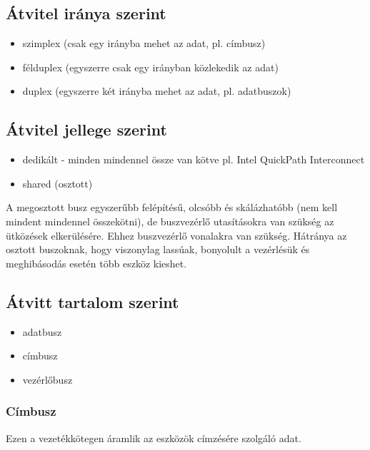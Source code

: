 \subsection{Átvitel iránya szerint}
\begin{itemize}
    \item szimplex (csak egy irányba mehet az adat, pl. címbusz)
    \item félduplex (egyszerre csak egy irányban közlekedik az adat)
    \item duplex (egyszerre két irányba mehet az adat, pl. adatbuszok)
\end{itemize}

\subsection{Átvitel jellege szerint}
\begin{itemize}
    \item dedikált - minden mindennel össze van kötve pl. Intel QuickPath Interconnect
    \item shared (osztott)
\end{itemize}
A megosztott busz egyszerűbb felépítésű, olcsóbb és skálázhatóbb (nem kell mindent mindennel összekötni), de buszvezérlő utasításokra van szükség az ütközések elkerülésére.
Ehhez buszvezérlő vonalakra van szükség.
Hátránya az osztott buszoknak, hogy viszonylag lassúak, bonyolult a vezérlésük és meghibásodás esetén több eszköz kieshet.

\subsection{Átvitt tartalom szerint}
\begin{itemize}
    \item adatbusz
    \item címbusz
    \item vezérlőbusz
\end{itemize}

\subsubsection{Címbusz}
Ezen a vezetékkötegen áramlik az eszközök címzésére szolgáló adat.
